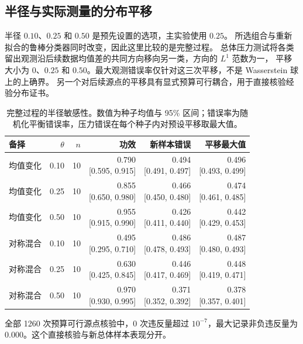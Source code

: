 \documentclass[11pt,a4paper]{article}
\begin{document}
\subsection{半径与实际测量的分布平移}
半径 $0.10$、$0.25$ 和 $0.50$ 是预先设置的选项，主实验使用 $0.25$。
所选组合与重新拟合的鲁棒分类器同时改变，因此这里比较的是完整过程。
总体压力测试将各类留出观测沿后续数据均值差的共同方向移向另一类，方向的 $L^1$ 范数为一，
平移大小为 $0$、$0.25$ 和 $0.50$。最大观测错误率仅针对这三次平移，不是 Wasserstein 球上的上确界。
另一个对后续源点的平移具有显式预算可行耦合，用于直接核验经验分布证书。
\begin{table}[tbp]\centering\small\setlength{\tabcolsep}{3.5pt}
\caption{完整过程的半径敏感性。数值为种子均值与 95\% 区间；错误率为随机化平衡错误率，压力错误在每个种子内对预设平移取最大值。}\label{tab:radius}
\begin{tabularx}{\linewidth}{@{}p{22mm}rrrrr@{}}
\toprule 备择 & $\theta$ & $n$ & 功效 & 新样本错误 & 平移最大值 \\
\midrule
均值变化 & 0.10 & 10 & \shortstack{0.790\\{[0.595, 0.915]}} & \shortstack{0.494\\{[0.491, 0.497]}} & \shortstack{0.496\\{[0.493, 0.499]}} \\
均值变化 & 0.25 & 10 & \shortstack{0.855\\{[0.650, 0.980]}} & \shortstack{0.466\\{[0.450, 0.480]}} & \shortstack{0.474\\{[0.461, 0.485]}} \\
均值变化 & 0.50 & 10 & \shortstack{0.955\\{[0.915, 0.990]}} & \shortstack{0.426\\{[0.411, 0.440]}} & \shortstack{0.442\\{[0.429, 0.453]}} \\
对称混合 & 0.10 & 10 & \shortstack{0.495\\{[0.295, 0.710]}} & \shortstack{0.486\\{[0.478, 0.493]}} & \shortstack{0.487\\{[0.480, 0.493]}} \\
对称混合 & 0.25 & 10 & \shortstack{0.630\\{[0.425, 0.845]}} & \shortstack{0.446\\{[0.417, 0.469]}} & \shortstack{0.448\\{[0.419, 0.471]}} \\
对称混合 & 0.50 & 10 & \shortstack{0.970\\{[0.930, 0.995]}} & \shortstack{0.371\\{[0.352, 0.392]}} & \shortstack{0.378\\{[0.357, 0.401]}} \\
\bottomrule\end{tabularx}\end{table}
全部 1260 次预算可行源点核验中，0 次违反量超过 $10^{-7}$，最大记录非负违反量为 0.000。这个直接核验与新总体样本表现分开。
\end{document}
